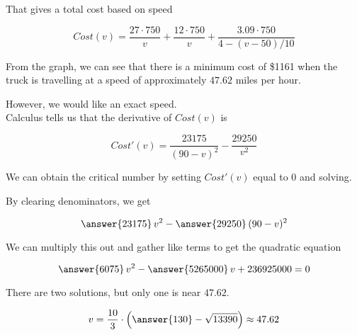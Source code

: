 \documentclass{ximera}
\begin{document}
That gives a total cost based on speed

\[
Cost(v) = \frac{27 \cdot 750}{v} + \frac{12 \cdot 750}{v} + \frac{3.09 \cdot 750}{4-(v-50)/10}
\]





\begin{center}
\end{center}



From the graph, we can see that there is a minimum cost of \$1161 when the truck is travelling at a speed of approximately $47.62$ miles per hour.




However, we would like an exact speed. \\





Calculus tells us that the derivative of $Cost(v)$ is


\[
Cost'(v) = \frac{23175}{(90-v)^2} - \frac{29250}{v^2}
\]



We can obtain the critical number by setting $Cost'(v)$ equal to $0$ and solving.



By clearing denominators, we get

\[
\answer{23175} \, v^2 - \answer{29250} \, (90-v)^2
\]


We can multiply this out and gather like terms to get the quadratic equation

\[
\answer{6075} \, v^2 - \answer{5265000} \, v + 236925000 = 0
\]



There are two solutions, but only one is near $47.62$.


\[
v = \frac{10}{3} \cdot \left( \answer{130} - \sqrt{13390} \right) \approx 47.62
\]
\end{document}

